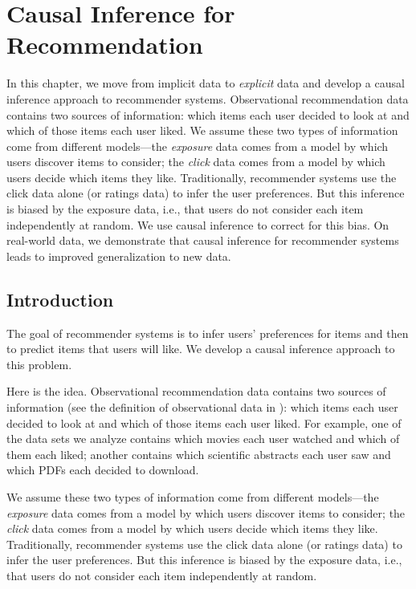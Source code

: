 

\chapter{Causal Inference for Recommendation} \label{chpt:causal_rec}

In this chapter, we move from implicit data to \textit{explicit} data and develop a causal inference approach to recommender systems.
Observational recommendation data contains two sources of
information: which items each user decided to look at and which of
those items each user liked.  We assume these two types of
information come from different models---the \textit{exposure} data
comes from a model by which users discover items to consider; the
\textit{click} data comes from a model by which users decide which
items they like.  Traditionally, recommender systems use the
click data alone (or ratings data) to infer the user preferences.
But this inference is biased by the exposure data, i.e., that users
do not consider each item independently at random.  We use causal
inference to correct for this bias. On real-world data, we
demonstrate that causal inference for recommender systems leads
to improved generalization to new data.


\section{Introduction}

The goal of recommender systems is to infer users' preferences for
items and then to predict items that users will like. We develop a
causal inference approach to this problem.

Here is the idea. Observational recommendation data contains two
sources of information (see the definition of observational data in ): which items each user decided to look at and
which of those items each user liked. For example, one of the data
sets we analyze contains which movies each user watched and which of
them each liked; another contains which scientific abstracts each user
saw and which PDFs each decided to download.

We assume these two types of information come from different
models---the \textit{exposure} data comes from a model by which users
discover items to consider; the \textit{click} data comes from a model
by which users decide which items they like. Traditionally,
recommender systems use the click data alone (or ratings data) to
infer the user preferences. But this inference is biased by the
exposure data, i.e., that users do not consider each item
independently at random.

